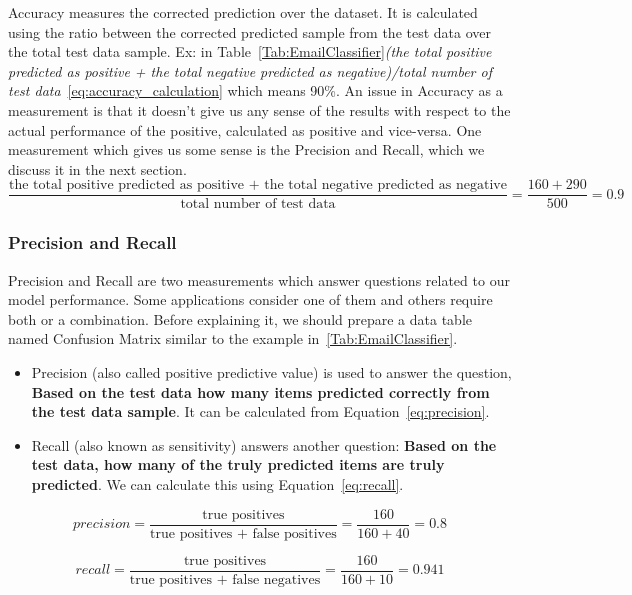 Accuracy measures the corrected prediction over the dataset. It is calculated using the ratio between the corrected predicted sample from the test data over the total test data sample. Ex: in Table~\ref{Tab:EmailClassifier}\textit{(the total positive predicted as positive + the total negative predicted as negative)/total number of test data}~\eqref{eq:accuracy_calculation} which means 90\%. An issue in Accuracy as a measurement is that it doesn’t give us any sense of the results with respect to the actual performance of the positive, calculated as positive and vice-versa. One measurement which gives us some sense is the Precision and Recall, which we discuss it in the next section.%
\begin{equation}\label{eq:accuracy_calculation}
\frac{\text{the total positive predicted as positive + the total negative predicted as negative}}{\text{total number of test data}} = \frac{160+290}{500}=0.9 
\end{equation}%


\subsubsection{Precision and Recall}

Precision and Recall are two measurements which answer questions related to our model performance. Some applications consider one of them and others require both or a combination. Before explaining it, we should prepare a data table named Confusion Matrix similar to the example in~\ref{Tab:EmailClassifier}.

\begin{itemize}
\item Precision (also called positive predictive value) is used to answer the question, \textbf{Based on the test data how many items predicted correctly from the test data sample}. It can be calculated from Equation~\eqref{eq:precision}.
\item Recall (also known as sensitivity) answers another question: \textbf{Based on the test data, how many of the truly predicted items are truly predicted}. We can calculate this using Equation~\eqref{eq:recall}.
\end{itemize}
\begin{equation}\label{eq:precision}
precision = \frac{\text{true positives}}{\text{true positives + false positives}} = \frac{160}{160 + 40}=0.8
\end{equation}%


\begin{equation}\label{eq:recall}
recall = \frac{\text{true positives}}{\text{true positives + false negatives}} = \frac{160}{160 + 10}=0.941
\end{equation}%

